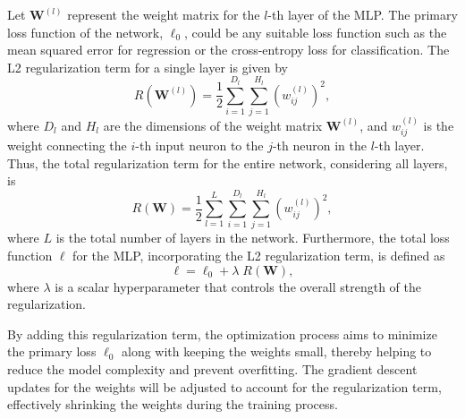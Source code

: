 Let $\mathbf{W}^{(l)}$ represent the weight matrix for the $l$-th layer of the MLP. The primary loss function of the network, $\ell_0$, could be any suitable loss function such as the mean squared error for regression or the cross-entropy loss for classification. The L2 regularization term for a single layer is given by
\begin{equation}
R(\mathbf{W}^{(l)}) = \frac{1}{2} \sum_{i=1}^{D_l} \sum_{j=1}^{H_l} \left( w^{(l)}_{ij} \right)^2,
\end{equation}
where $D_l$ and $H_l$ are the dimensions of the weight matrix $\mathbf{W}^{(l)}$, and $w^{(l)}_{ij}$ is the weight connecting the $i$-th input neuron to the $j$-th neuron in the $l$-th layer. Thus, the total regularization term for the entire network, considering all layers, is
\begin{equation}
R(\mathbf{W}) = \frac{1}{2} \sum_{l=1}^{L} \sum_{i=1}^{D_l} \sum_{j=1}^{H_l} \left( w^{(l)}_{ij} \right)^2,
\end{equation}
where $L$ is the total number of layers in the network. Furthermore, the total loss function $\ell$ for the MLP, incorporating the L2 regularization term, is defined as
\begin{equation}
\ell = \ell_0 + \lambda \; R(\mathbf{W}),
\end{equation}
where $\lambda$ is a scalar hyperparameter that controls the overall strength of the regularization.

By adding this regularization term, the optimization process aims to minimize the primary loss $\ell_0$ along with keeping the weights small, thereby helping to reduce the model complexity and prevent overfitting. The gradient descent updates for the weights will be adjusted to account for the regularization term, effectively shrinking the weights during the training process.

